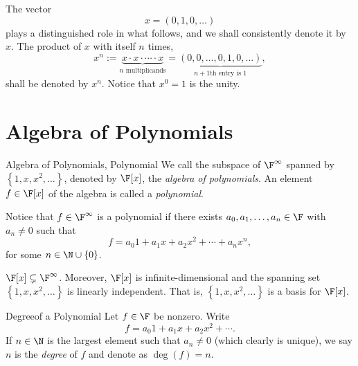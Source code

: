 \documentclass[linearalgebraII]{subfiles}
\begin{document}
    \begin{remark}
        The vector
        \begin{equation*}
            x = \left( 0, 1, 0, \ldots \right)
        \end{equation*}
        plays a distinguished role in what follows, and we shall consistently denote it by $x$. The product of $x$ with itself $n$ times,
        \begin{equation*}
            x^n := \underbrace{x\cdot x\cdot\cdots\cdot x}_{n\text{ multiplicands}} = \underbrace{\left( 0, 0, \ldots, 0, 1, 0, \ldots \right)}_{n+1\text{th entry is }1}, 
        \end{equation*}
        shall be denoted by $x^n$. Notice that $x^0 = 1$ is the unity. 
    \end{remark}

    \section{Algebra of Polynomials}

    \begin{definition}{Algebra of Polynomials, Polynomial}{}
        We call the subspace of $\F^\infty$ spanned by $\left\lbrace 1, x, x^2, \ldots \right\rbrace$, denoted by $\F[x]$, the \emph{algebra of polynomials}. An element $f\in\F[x]$ of the algebra is called a \emph{polynomial}.
    \end{definition}

    \begin{remark}
        Notice that $f\in \F^\infty$ is a polynomial if there exists $a_0, a_1, \ldots, a_n\in \F$ with $a_n\neq 0$ such that
        \begin{equation*}
            f = a_0 1+ a_1x+ a_2x^2 + \cdots + a_nx^n,
        \end{equation*}
        for some $n\in \N\cup\left\lbrace 0 \right\rbrace $.
    \end{remark}

    \begin{remark}
        $\F[x]\subsetneq \F^\infty$. Moreover, $\F[x]$ is infinite-dimensional and the spanning set $\left\lbrace 1, x, x^2, \ldots \right\rbrace$ is linearly independent. That is, $\left\lbrace 1, x, x^2, \ldots \right\rbrace$ is a basis for $\F[x]$.
    \end{remark}

    \begin{definition}{Degree}{of a Polynomial}
        Let $f\in \F$ be nonzero. Write
        \begin{equation*}
            f = a_0 1 + a_1x + a_2x^2 + \cdots.
        \end{equation*}
        If $n\in \N$ is the largest element such that $a_n\neq 0$ (which clearly is unique), we say $n$ is the \emph{degree} of $f$ and denote as $\deg(f) = n$.
    \end{definition}
\end{document}

